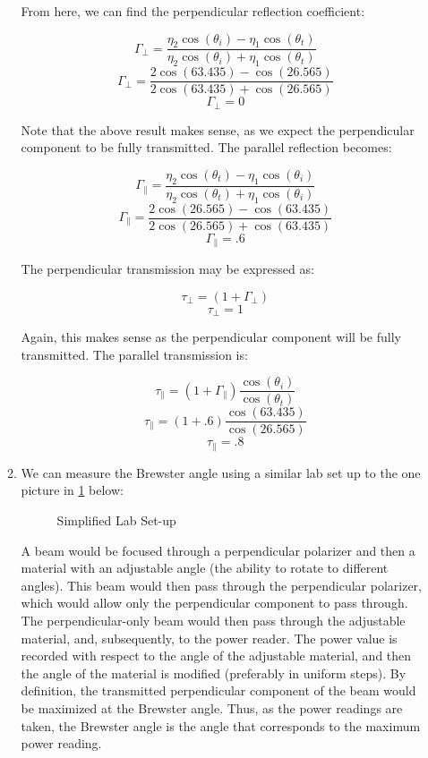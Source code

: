 \begin{enumerate}
\begin{enumerate}
        From here, we can find the perpendicular reflection coefficient:

        $$\Gamma_{\perp}=\frac{\eta_2\cos(\theta_i)-\eta_1\cos(\theta_t)}{\eta_2\cos(\theta_i)+\eta_1\cos(\theta_t)}$$
        $$\Gamma_{\perp}=\frac{2\cos(63.435)-\cos(26.565)}{2\cos(63.435)+\cos(26.565)}$$
        $$\boxed{\Gamma_{\perp}=0}$$

        Note that the above result makes sense, as we expect the perpendicular component to be fully transmitted. The parallel reflection becomes:

        $$\Gamma_{\parallel}=\frac{\eta_2\cos(\theta_t)-\eta_1\cos(\theta_i)}{\eta_2\cos(\theta_t)+\eta_1\cos(\theta_i)}$$
        $$\Gamma_{\parallel}=\frac{2\cos(26.565)-\cos(63.435)}{2\cos(26.565)+\cos(63.435)}$$
        $$\boxed{\Gamma_{\parallel}=.6}$$

        The perpendicular transmission may be expressed as:

        $$\tau_{\perp}=(1+\Gamma_{\perp})$$
        $$\boxed{\tau_{\perp}=1}$$

        Again, this makes sense as the perpendicular component will be fully transmitted. The parallel transmission is:

        $$\tau_{\parallel}=(1+\Gamma_{\parallel})\frac{\cos(\theta_i)}{\cos(\theta_t)}$$
        $$\tau_{\parallel}=(1+.6)\frac{\cos(63.435)}{\cos(26.565)}$$
        $$\boxed{\tau_{\parallel}=.8}$$

        \newpage

      \item 

        We can measure the Brewster angle using a similar lab set up to the one picture in \ref{fig:3} below:

        \begin{figure}[h!]
          \centering
          
          \caption{Simplified Lab Set-up}
          \label{fig:3}
        \end{figure}

        A beam would be focused through a perpendicular polarizer  and then a material with an adjustable angle (the ability to rotate to different angles). This beam would then pass through the perpendicular polarizer, which would allow only the perpendicular component to pass through. The perpendicular-only beam would then pass through the adjustable material, and, subsequently, to the power reader. The power value is recorded with respect to the angle of the adjustable material, and then the angle of the material is modified (preferably in uniform steps). By definition, the transmitted perpendicular component of the beam would be maximized at the Brewster angle. Thus, as the power readings are taken, the Brewster angle is the angle that corresponds to the maximum power reading. 


\end{enumerate}
\end{enumerate}

